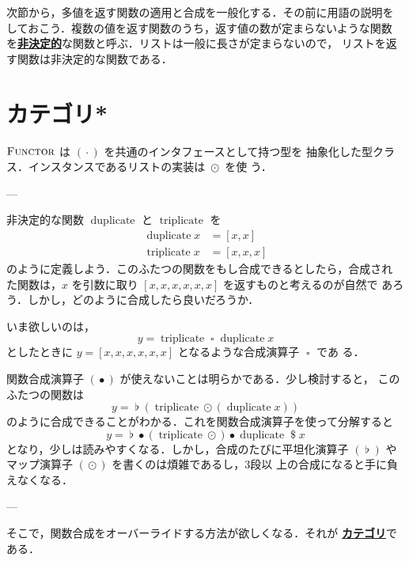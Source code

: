 \documentclass[a5paper,twoside,fleqn,draft]{jsbook}
\newcommand{\TK}[1]{\mask{\textbf{TK:}~#1}{C}}
\newcommand{\keyword}[1]{{\underline{\textbf{#1}}}}
\newcommand{\mSpecialFunc}[1]{#1}
\DeclareMathOperator{\mDuplicate}{\mSpecialFunc{duplicate}}
\DeclareMathOperator{\mTriplicate}{\mSpecialFunc{triplicate}}
\DeclareMathOperator{\mApply}{\$}
\DeclareMathOperator{\mComp}{\bullet}
\DeclareMathOperator{\mJoinList}{\flat} %
\DeclareMathOperator{\mMap}{\cdot}
\DeclareMathOperator{\mMapList}{\odot}
\DeclareMathOperator{\mSomeOp}{\square}
\newcommand{\mTypeClass}[1]{\textsc{#1}} %
\newcommand{\mFunctorTypeClass}{\mTypeClass{Functor}}
\begin{document}
次節から，多値を返す関数の適用と合成を一般化する．その前に用語の説明を
しておこう．複数の値を返す関数のうち，返す値の数が定まらないような関数
を\keyword{非決定的}な関数と呼ぶ．リストは一般に長さが定まらないので，
リストを返す関数は非決定的な関数である．


\section{カテゴリ*}

\TK{Writing.}

$\mFunctorTypeClass$ は $(\mMap)$ を共通のインタフェースとして持つ型を
抽象化した型クラス．インスタンスであるリストの実装は $\mMapList$ を使
う．

---

非決定的な関数 $\mDuplicate$ と $\mTriplicate$ を
\begin{align}
  \mDuplicate x
  &=[x,x]\\
  \mTriplicate x
  &=[x,x,x]
\end{align}
のように定義しよう．このふたつの関数をもし合成できるとしたら，合成され
た関数は，$x$ を引数に取り $[x,x,x,x,x,x]$ を返すものと考えるのが自然で
あろう．しかし，どのように合成したら良いだろうか．

いま欲しいのは，
\begin{equation}
  y
  =\mTriplicate\mSomeOp\mDuplicate x
\end{equation}
としたときに $y=[x,x,x,x,x,x]$ となるような合成演算子 $\mSomeOp$ であ
る．

関数合成演算子 $(\mComp)$ が使えないことは明らかである．少し検討すると，
このふたつの関数は
\begin{equation}
  y
  =\mJoinList(\mTriplicate\mMapList(\mDuplicate x))
\end{equation}
のように合成できることがわかる．これを関数合成演算子を使って分解すると
\begin{equation}
  \label{eq:triplicate-duplicate}
  y
  =\mJoinList\mComp(\mTriplicate\mMapList)\mComp\mDuplicate\mApply x
\end{equation}
となり，少しは読みやすくなる．しかし，合成のたびに平坦化演算子
$(\mJoinList)$ やマップ演算子 $(\mMapList)$ を書くのは煩雑であるし，3段以
上の合成になると手に負えなくなる．

---

そこで，関数合成をオーバーライドする方法が欲しくなる．それが
\keyword{カテゴリ}である．
\end{document}
